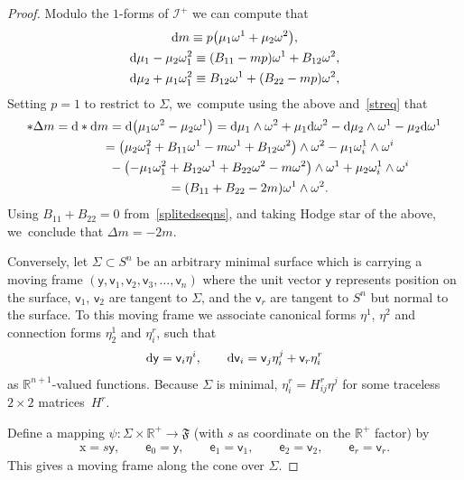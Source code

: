 \documentclass[10pt,a4paper]{amsart}
\def\R{\mathbb{R}}
\def\ve{\mathsf{e}}
\def\vv{\mathsf{v}}
\def\vx{\boldsymbol{\mathrm{x}}}
\def\vy{\mathsf{y}}
\def\F{\mathfrak{F}}
\def\calI{\mathcal{I}}
\def\w{\omega}
\numberwithin{equation}{section}
\begin{document}
\begin{proof}
Modulo the $1$-forms of $\calI^+$ we can compute that
\begin{gather*}
{\rm d}m \equiv p\big(\mu_1 \w^1 + \mu_2 \w^2\big),
\\
{\rm d}\mu_1 -\mu_2 \w^2_1 \equiv (B_{11} -mp) \w^1 + B_{12} \w^2,
\\
{\rm d}\mu_2 +\mu_1 \w^2_1 \equiv B_{12} \w^1 + (B_{22} - mp) \w^2,
\end{gather*}
Setting $p=1$ to restrict to $\Sigma$, we~compute using the above and~\eqref{streq} that
\begin{gather*}
* \Delta m = {\rm d} * {\rm d} m = {\rm d} \big( \mu_1 \w^2 - \mu_2 \w^1 \big)
 = {\rm d} \mu_1 \wedge \w^2 + \mu_1 {\rm d} \w^2 - {\rm d}\mu_2 \wedge \w^1 - \mu_2 {\rm d}\w^1
 \\ \hphantom{* \Delta m }
 {}= \big( \mu_2 \w^2_1 + B_{11} \w^1 - m \w^1 + B_{12} \w^2\big) \wedge \w^2 - \mu_1 \w^1_i \wedge \w^i
 \\ \hphantom{* \Delta m= ( }
{} - \big( {-} \mu_1 \w^2_1 + B_{12} \w^1 + B_{22} \w^2 - m \w^2 \big) \wedge \w^1 + \mu_2 \w^1_i \wedge \w^i
\\ \hphantom{* \Delta m }
{} = ( B_{11} + B_{22} - 2 m) \w^1 \wedge \w^2.
\end{gather*}
Using $B_{11} + B_{22}=0$ from~\eqref{splitedseqns}, and taking Hodge star of the above, we~conclude that \mbox{$\Delta m = -2m$}.

Conversely, let $\Sigma \subset S^n$ be an arbitrary minimal surface which is carrying a moving frame $(\vy,\vv_1,\vv_2,\vv_3,\dots, \vv_n)$ where the unit vector $\vy$ represents position on the surface, $\vv_1$, $\vv_2$ are tangent to $\Sigma$, and the $\vv_r$ are tangent to $S^n$ but normal to the surface. To this moving frame we associate canonical forms $\eta^1$, $\eta^2$ and connection forms $\eta^1_2$ and $\eta^r_i$, such that
\begin{gather*}
{\rm d}\vy = \vv_i \eta^i, \qquad
 {\rm d}\vv_i = \vv_j \eta^j_i + \vv_r \eta^r_i
\end{gather*}
as $\R^{n+1}$-valued functions. Because $\Sigma$ is minimal, $\eta^r_i = H^r_{ij}\eta^j$ for some traceless $2\times 2$ matrices~$H^r$.

Define a mapping $\psi\colon \Sigma \times \R^+ \to \F$ (with $s$ as coordinate on the $\R^+$ factor) by
\begin{gather*}
\vx = s \vy,\qquad
\ve_0 = \vy, \qquad
\ve_1 = \vv_1, \qquad
\ve_2 = \vv_2, \qquad
\ve_r = \vv_r.
\end{gather*}
This gives a moving frame along the cone over $\Sigma$.


\end{proof}
\end{document}

